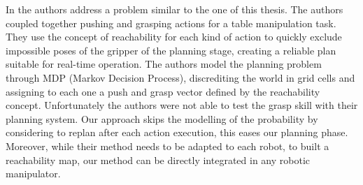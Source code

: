 

In \citep{coelhoplanning} the authors address a problem similar to the one of this thesis. The authors coupled together pushing and grasping actions for a table manipulation task.
They use the concept of reachability \citep{vahrenkamp2013robot} for each kind of action to quickly exclude impossible poses of the gripper of the planning stage, creating a reliable plan suitable for real-time operation. The authors model the planning problem through MDP (Markov Decision Process), discrediting the world in grid cells and assigning to each one a push and grasp vector defined by the reachability concept. Unfortunately the authors were not able to test the grasp skill with their planning system. 
Our approach skips the modelling of the probability by considering to replan after each action execution, this eases our planning phase. Moreover, while their method needs to be adapted to each robot, to built a reachability map, our method can be directly integrated in any robotic manipulator. 

